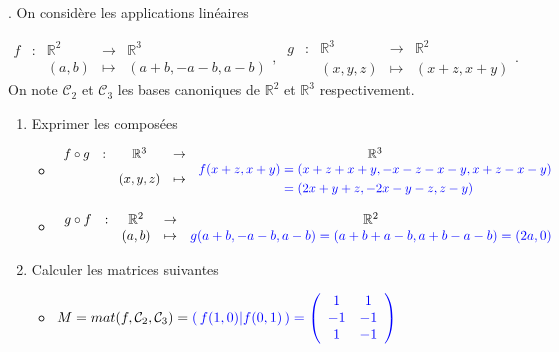 \documentclass[a4paper,12pt]{article}
\def\R{\mathbb{R}}
\newcommand{\add}[1]{\textcolor{blue}{#1}}
\begin{document}
\begin{exercice}.
On considère les applications linéaires
    
            $$\begin{array}{ccccc}
                f & : & \R^2 & \to & \R^3 \\
                  &   & (a,b) & \mapsto & (a+b, -a-b, a-b)
              \end{array},
              \:
              \begin{array}{ccccc}
                g & : & \R^3 & \to & \R^2 \\
                  &   & (x,y,z) & \mapsto & (x+z, x+y)
              \end{array}.
            $$
On note $\mathcal C_2$ et $\mathcal C_3$ les bases canoniques de $\R^2$ et $\R^3$ respectivement.
\begin{enumerate}
    \item Exprimer les composées 
        \begin{itemize}
            \item  $\begin{array}{ccccc}
                f\circ g & : & \R^3 & \to & \R^3 \\
                  &   & (x,y,z) & \mapsto & \add{
                    \begin{aligned}
                        f(x+z,x+y)&=(x+z+x+y,-x-z-x-y, x+z-x-y)\\
                        &=(2x+y+z,-2x-y-z,z-y)
                    \end{aligned}}
                    \end{array}$
            \item  $  \begin{array}{ccccc}
                g\circ f & : & \R^2 & \to & \R^2 \\
                  &   & (a,b) & \mapsto & \add{ g(a+b,-a-b,a-b)=(a+b+a-b,a+b-a-b)=(2a,0) }
                     \end{array}
                $
        \end{itemize}
    \item Calculer les matrices suivantes

        \begin{itemize}
            \item $M=mat(f,\mathcal C_2, \mathcal C_3) =\add{(\,f(1,0)|f(0,1)\,) = \left(\begin{array}{cc} 1 &1\\ -1 & -1 \\ 1 & -1\end{array}\right)}$


\end{itemize}
\end{enumerate}
\end{exercice}
\end{document}

